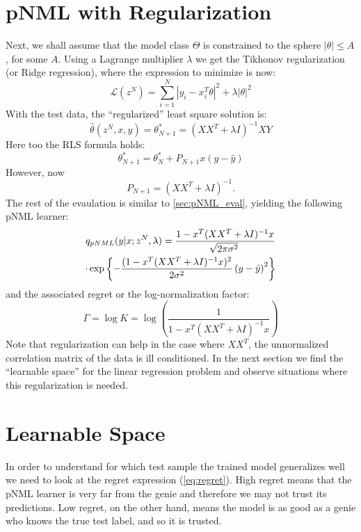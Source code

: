 \documentclass[conference,letterpaper]{IEEEtran}
\begin{document}
\section{pNML with Regularization} \label{sec:pNMLwithReg}
Next, we shall assume that the model class $\Theta$ is constrained to the sphere  $|\theta|\leq A$, for some $A$. 
Using a Lagrange multiplier $\lambda$ we get the Tikhonov regularization (or Ridge regression), where the expression to minimize is now: 
\begin{equation}
\mathcal{L}(z^N)= \sum_{i=1}^{N}|y_i-x_i^T \theta|^2 + \lambda |\theta|^2
\end{equation}
With the test data, the ``regularized'' least square solution is:
\begin{equation}
\hat{\theta}(z^N,x,y) = \theta_{N+1}^* = (X X^T+ \lambda I)^{-1} X Y
\end{equation}
Here too the RLS formula holds: 
\begin{equation}
\theta_{N+1}^*=\theta^*_{N} + P_{N+1} x (y - \hat{y})
\end{equation}
However, now 
\begin{equation}
P_{N+1}= (X X^T+ \lambda I)^{-1}.    
\end{equation}
The rest of the evaulation is similar to \ref{sec:pNML_eval}, yielding the following pNML learner:
\begin{multline} \label{eq:pNML_least_sqaures}
q_{\mbox{\tiny{pNML}}}(y|x; z^N, \lambda)
=\frac{1 - x^T (XX^T + \lambda I)^{-1} x }{\sqrt[]{2\pi\sigma^2}} \\
\cdot \exp\left\{-\frac{(1 - x^T (XX^T + \lambda I)^{-1} x )^2 }{2\sigma^2}\left(y- \hat{y} \right)^2\right\} \\
\end{multline}
and the associated regret or the log-normalization factor:
\begin{equation}
\Gamma = \log K = \log \left( \frac{1}{1 - x^T (XX^T + \lambda I)^{-1} x } \right)
\end{equation}
Note that regularization can help in the case where $XX^T$, the unnormalized correlation matrix of the data is
ill conditioned. 
In the next section we find the ``learnable space'' for the linear regression problem and observe situations where this regularization is needed.

\section{Learnable Space} \label{sec:learnable_space}
In order to understand for which test sample the trained model generalizes well we need to look at the regret expression (\ref{eq:regret}). 
High regret means that the pNML learner is very far from the genie and therefore we may not trust its predictions. 
Low regret, on the other hand, means the model is as good as a genie who knows the true test label, and so it is trusted.
\end{document}
